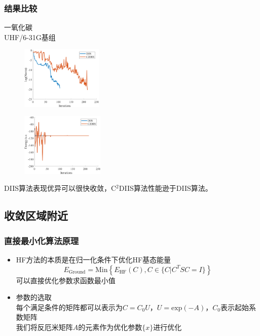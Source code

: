 \documentclass[10pt,aspectratio=43,mathserif,UTF8]{beamer}
\begin{document}
\begin{frame}
	\frametitle{结果比较}
	一氧化碳\\
	UHF/6-31G基组
	\begin{figure}[ht!]
		\centering
		\begin{minipage}{0.4\linewidth}
			\centering
			\includegraphics[height=3cm]{figure/co/LOG2.png}
			\label{fig:co:lognorm}
		\end{minipage}
		\begin{minipage}{0.4\linewidth}
			\centering
			\includegraphics[height=3cm]{figure/co/E2.png}
			\label{fig:co:E}
		\end{minipage}
		\label{fig:co}
	\end{figure}
	\centerline{DIIS算法表现优异可以很快收敛，C$^2$DIIS算法性能逊于DIIS算法。}
\end{frame}


\subsection{收敛区域附近}
\begin{frame}
	\frametitle{直接最小化算法原理}
	\begin{itemize}
		\item
		HF方法的本质是在归一化条件下优化HF基态能量
		\begin{equation}
		E_{\text{Ground}}=\text{Min}\left \{ E_{\text{HF}}(C), C \in  \{C| C^TSC=I  \} \right \}
		\end{equation}
		可以直接优化参数求函数最小值
		
		\item 参数的选取\\
		每个满足条件的矩阵都可以表示为$C=C_0U$，$U=\text{exp}(-A)$，$C_0$表示起始系数矩阵\\
		我们将反厄米矩阵$A$的元素作为优化参数$\{x\}$进行优化
	\end{itemize}


	
\end{frame}
\end{document}
